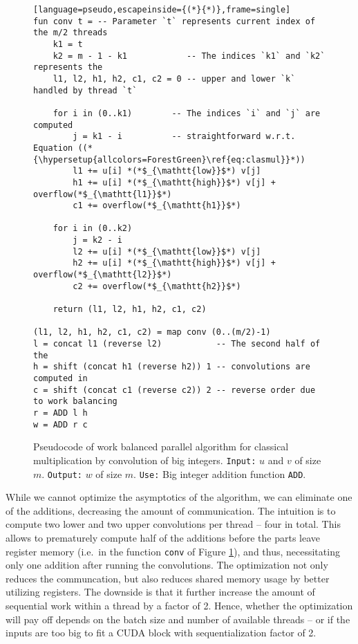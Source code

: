 \begin{figure}
\begin{lstlisting}[language=pseudo,escapeinside={(*}{*)},frame=single]
fun conv t = -- Parameter `t` represents current index of the m/2 threads
    k1 = t
    k2 = m - 1 - k1            -- The indices `k1` and `k2` represents the
    l1, l2, h1, h2, c1, c2 = 0 -- upper and lower `k` handled by thread `t`

    for i in (0..k1)        -- The indices `i` and `j` are computed
        j = k1 - i          -- straightforward w.r.t. Equation ((*{\hypersetup{allcolors=ForestGreen}\ref{eq:clasmul}}*))
        l1 += u[i] *(*$_{\mathtt{low}}$*) v[j]
        h1 += u[i] *(*$_{\mathtt{high}}$*) v[j] + overflow(*$_{\mathtt{l1}}$*)
        c1 += overflow(*$_{\mathtt{h1}}$*)

    for i in (0..k2)
        j = k2 - i
        l2 += u[i] *(*$_{\mathtt{low}}$*) v[j]
        h2 += u[i] *(*$_{\mathtt{high}}$*) v[j] + overflow(*$_{\mathtt{l2}}$*)
        c2 += overflow(*$_{\mathtt{h2}}$*)

    return (l1, l2, h1, h2, c1, c2)

(l1, l2, h1, h2, c1, c2) = map conv (0..(m/2)-1)
l = concat l1 (reverse l2)           -- The second half of the
h = shift (concat h1 (reverse h2)) 1 -- convolutions are computed in
c = shift (concat c1 (reverse c2)) 2 -- reverse order due to work balancing
r = ADD l h
w = ADD r c
\end{lstlisting}
  \caption{\footnotesize Pseudocode of work balanced parallel algorithm for classical multiplication by convolution of big integers. \texttt{Input:} $u$ and $v$ of size $m$. \texttt{Output:} $w$ of size $m$. \texttt{Use:} Big integer addition function \texttt{ADD}.}
  \label{fig:mulparalg}
\end{figure}

While we cannot optimize the asymptotics of the algorithm, we can eliminate one
of the additions, decreasing the amount of communication. The intuition is to
compute two lower and two upper convolutions per thread -- four in total. This
allows to prematurely compute half of the additions before the parts leave
register memory (i.e.\ in the function \texttt{conv} of Figure
\ref{fig:mulparalg}), and thus, necessitating only one addition after running
the convolutions. The optimization not only reduces the communcation, but also
reduces shared memory usage by better utilizing registers. The downside is that
it further increase the amount of sequential work within a thread by a factor of
2. Hence, whether the optimization will pay off depends on the batch size and
number of available threads -- or if the inputs are too big to fit a CUDA block
with sequentialization factor of 2.

